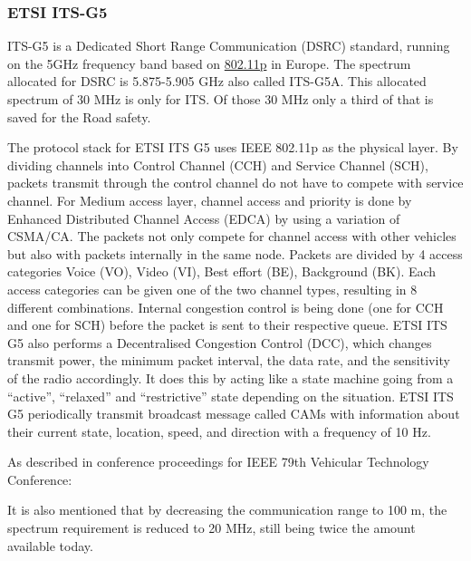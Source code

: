 \subsubsection{ETSI ITS-G5}\label{sec:ITS-G5}
ITS-G5 is a Dedicated Short Range Communication (DSRC) standard, running on the 5GHz frequency band based on \hyperref[sec:802.11p]{802.11p} in Europe.
The spectrum allocated for DSRC is 5.875-5.905 GHz also called ITS-G5A. This allocated spectrum of 30 MHz is only for ITS. Of those 30 MHz only a third of that is saved for the Road safety.\par
% 
The protocol stack for ETSI ITS G5 uses IEEE 802.11p as the physical layer. By dividing channels into Control Channel (CCH) and Service Channel (SCH), packets transmit through the control channel do not have to compete with service channel. For Medium access layer, channel access and priority is done by Enhanced Distributed Channel Access (EDCA) by using a variation of CSMA/CA. The packets not only compete for channel access with other vehicles but also with packets internally in the same node. Packets are divided by 4 access categories Voice (VO), Video (VI), Best effort (BE), Background (BK). Each access categories can be given one of the two channel types, resulting in 8 different combinations. Internal congestion control is being done (one for CCH and one for SCH) before the packet is sent to their respective queue. ETSI ITS G5 also performs a Decentralised Congestion Control (DCC), which changes transmit power, the minimum packet interval, the data rate, and the sensitivity of the radio accordingly. It does this by acting like a state machine going from a “active”, “relaxed” and “restrictive” state depending on the situation.
ETSI ITS G5 periodically transmit broadcast message called CAMs with information about their current state, location, speed, and direction with a frequency of 10 Hz.\par
% 
As described in conference proceedings for IEEE 79th Vehicular Technology Conference: \par 
% 
It is also mentioned that by decreasing the communication range to 100 m, the spectrum requirement is reduced to 20 MHz, still being twice the amount available today. 